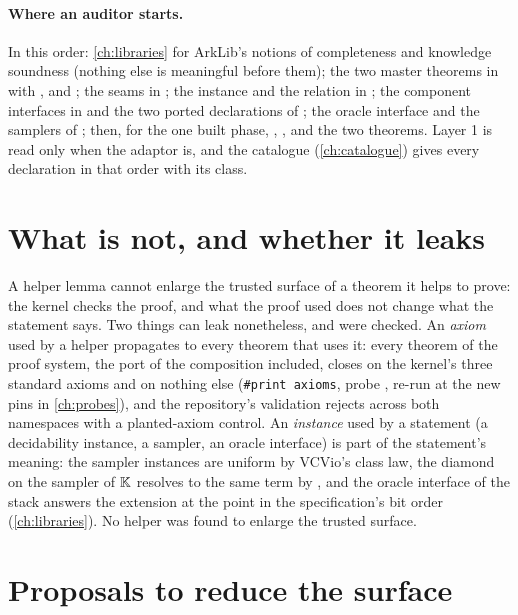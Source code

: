 \paragraph{Where an auditor starts.} In this order: \cref{ch:libraries} for ArkLib's notions
of completeness and knowledge soundness (nothing else is meaningful before them); the two
master theorems in  with ,  and
; the seams in ; the instance and the relation in
; the component interfaces in  and
the two ported declarations of ; the oracle interface and
the samplers of ; then, for the one built phase, ,
,  and the two theorems. Layer 1 is read only when the adaptor is,
and the catalogue (\cref{ch:catalogue}) gives every declaration in that order with its class.

\section{What is not, and whether it leaks}\label{sec:aud-helpers}

A helper lemma cannot enlarge the trusted surface of a theorem it helps to prove: the kernel
checks the proof, and what the proof used does not change what the statement says. Two things
can leak nonetheless, and were checked. An \emph{axiom} used by a helper propagates to every
theorem that uses it: every theorem of the proof system, the port of the composition included,
closes on the kernel's three standard axioms and on nothing else (\texttt{\#print axioms},
probe , re-run at the new pins in \cref{ch:probes}), and the repository's
validation rejects  across both namespaces with a planted-axiom control. An
\emph{instance} used by a statement (a decidability instance, a sampler, an oracle interface)
is part of the statement's meaning: the sampler instances are uniform by VCVio's class law, the
diamond on the sampler of $\mathbb{K}$ resolves to the same term by , and the oracle
interface of the stack answers the extension at the point in the specification's bit order
(\cref{ch:libraries}). No helper was found to enlarge the trusted surface.

\section{Proposals to reduce the surface}\label{sec:aud-proposals}

